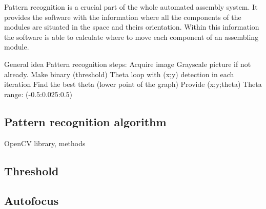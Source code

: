 Pattern recognition is a crucial part of the whole automated assembly system. It provides the software with the information where all the components of the modules are situated in the space and theirs orientation. Within this information the software is able to calculate where to move each component of an assembling module.



General idea
Pattern recognition steps:
Acquire image
Grayscale picture if not already.
Make binary (threshold)
Theta loop with (x;y) detection in each iteration
Find the best theta (lower point of the graph)
Provide (x;y;theta)
Theta range:
(-0.5:0.025:0.5)


\subsection{Pattern recognition algorithm}

OpenCV library, methods



\subsection{Threshold}



\subsection{Autofocus}






